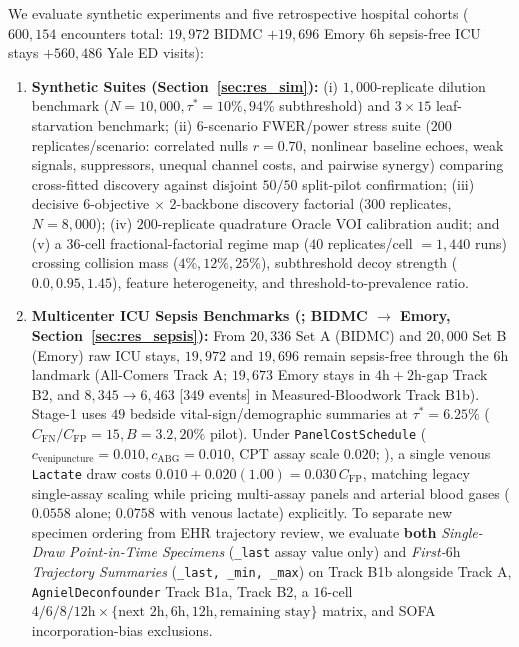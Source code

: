\documentclass[11pt]{article}
\begin{document}
We evaluate synthetic experiments and five retrospective hospital cohorts ($600{,}154$ encounters total: $19{,}972$ BIDMC $+ 19{,}696$ Emory $6\text{h}$ sepsis-free ICU stays $+ 560{,}486$ Yale ED visits):
\begin{enumerate}
  \item \textbf{Synthetic Suites (Section~\ref{sec:res_sim}):} (i) $1{,}000$-replicate dilution benchmark ($N=10{,}000, \tau^*=10\%, 94\%$ subthreshold) and $3\times 15$ leaf-starvation benchmark; (ii) $6$-scenario FWER/power stress suite ($200$ replicates/scenario: correlated nulls $r=0.70$, nonlinear baseline echoes, weak signals, suppressors, unequal channel costs, and pairwise synergy) comparing cross-fitted discovery against disjoint $50/50$ split-pilot confirmation; (iii) decisive $6$-objective $\times$ $2$-backbone discovery factorial ($300$ replicates, $N=8{,}000$); (iv) $200$-replicate quadrature Oracle VOI calibration audit; and (v) a $36$-cell fractional-factorial regime map ($40$ replicates/cell $= 1{,}440$ runs) crossing collision mass ($4\%, 12\%, 25\%$), subthreshold decoy strength ($0.0, 0.95, 1.45$), feature heterogeneity, and threshold-to-prevalence ratio.
  \item \textbf{Multicenter ICU Sepsis Benchmarks (\citealp{goldberger2000physionet,reyna2020early}; BIDMC $\to$ Emory, Section~\ref{sec:res_sepsis}):} From $20{,}336$ Set A (BIDMC) and $20{,}000$ Set B (Emory) raw ICU stays, $19{,}972$ and $19{,}696$ remain sepsis-free through the $6\text{h}$ landmark (All-Comers Track A; $19{,}673$ Emory stays in $4\text{h}+2\text{h}$-gap Track B2, and $8{,}345 \to 6{,}463$ [$349$ events] in Measured-Bloodwork Track B1b). Stage-1 uses $49$ bedside vital-sign/demographic summaries at $\tau^*=6.25\%$ ($C_{\text{FN}}/C_{\text{FP}}=15, B=3.2, 20\%$ pilot). Under \texttt{PanelCostSchedule} ($c_{\text{venipuncture}}=0.010, c_{\text{ABG}}=0.010$, CPT assay scale $0.020$; \citealp{cms2025clfs}), a single venous \texttt{Lactate} draw costs $0.010 + 0.020(1.00) = 0.030\,C_{\text{FP}}$, matching legacy single-assay scaling while pricing multi-assay panels and arterial blood gases ($0.0558$ alone; $0.0758$ with venous lactate) explicitly. To separate new specimen ordering from EHR trajectory review, we evaluate \textbf{both} \emph{Single-Draw Point-in-Time Specimens} (\texttt{\_last} assay value only) and \emph{First-$6\text{h}$ Trajectory Summaries} (\texttt{\_last, \_min, \_max}) on Track B1b alongside Track A, \texttt{AgnielDeconfounder} Track B1a, Track B2, a $16$-cell $4/6/8/12\text{h} \times \{\text{next }2\text{h}, 6\text{h}, 12\text{h}, \text{remaining stay}\}$ matrix, and SOFA incorporation-bias exclusions.

\end{enumerate}
\end{document}
